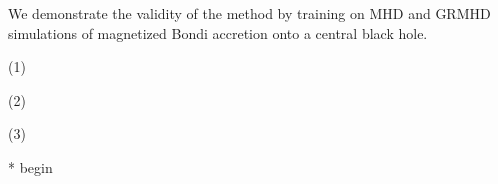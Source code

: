 \documentclass[%
 reprint,
 superscriptaddress,
 amsmath,amssymb,
 nofootinbib,
 prd,
]{revtex4-2}
\begin{document}
We demonstrate the validity of the method by training on MHD and GRMHD simulations of magnetized Bondi accretion onto a central black hole.


(1) 

(2)

(3)

* begin 


\end{document}
